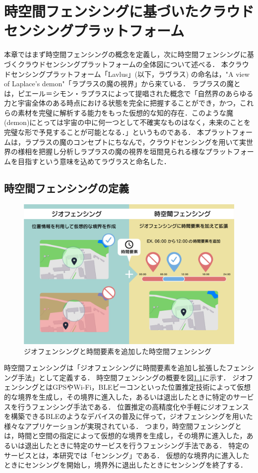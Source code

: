 \chapter{時空間フェンシングに基づいたクラウドセンシングプラットフォーム}
\thispagestyle{myheadings}
本章ではまず時空間フェンシングの概念を定義し，次に時空間フェンシングに基づくクラウドセンシングプラットフォームの全体図について述べる．
本クラウドセンシングプラットフォーム「Lavlus」(以下，ラヴラス) の命名は，"A view of Laplace's demon"「ラプラスの魔の視界」から来ている．
ラプラスの魔とは，ピエール＝シモン・ラプラスによって提唱された概念で「自然界のあらゆる力と宇宙全体のある時点における状態を完全に把握することができ，かつ，これらの素材を完璧に解析する能力をもった仮想的な知的存在．このような魔(demon)にとっては宇宙の中に何一つとして不確実なものはなく，未来のことを完璧な形で予見することが可能となる．」\cite{ziten}というものである．
本プラットフォームは，ラプラスの魔のコンセプトにちなんで，クラウドセンシングを用いて実世界の様相を把握し分析しラプラスの魔の視界を垣間見られる様なプラットフォームを目指すという意味を込めてラヴラスと命名した．

\section{時空間フェンシングの定義}
\label{STF}

\begin{figure}[tbh]
    \centering
    \includegraphics[width=16cm]{img_STF.png}
    \caption{ジオフェンシングと時間要素を追加した時空間フェンシング}
    \label{fig:STF}
\end{figure}

時空間フェンシングは「ジオフェンシングに時間要素を追加し拡張したフェンシング手法」として定義する．
時空間フェンシングの概要を図\ref{fig:STF}に示す．
ジオフェンシングとはGPSやWi-Fi，BLEビーコンといった位置推定技術によって仮想的な境界を生成し，その境界に進入した，あるいは退出したときに特定のサービスを行うフェンシング手法である．
位置推定の高精度化や手軽にジオフェンスを構築できるBLEのようなデバイスの普及に伴って，ジオフェンシングを用いた様々なアプリケーションが実現されている．
つまり，時空間フェンシングとは，時間と空間の指定によって仮想的な境界を生成し，その境界に進入した，あるいは退出したときに特定のサービスを行うフェンシング手法である．
特定のサービスとは，本研究では「センシング」である．
仮想的な境界内に進入したときにセンシングを開始し，境界外に退出したときにセンシングを終了する．

